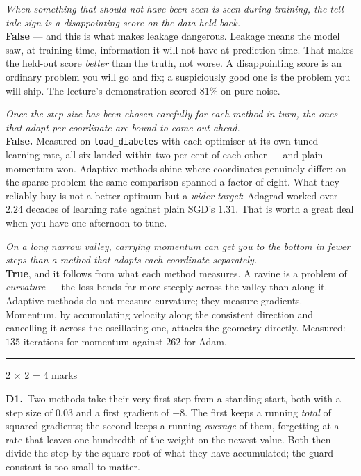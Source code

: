 \documentclass[10pt,a4paper]{article}
\newcommand{\parthead}[2]{\vspace{2pt}\noindent\rule{\linewidth}{0.4pt}\par\vspace{2pt}%
  \noindent{\bfseries Part #1}\hfill{\small #2}\par\vspace{1pt}}
\begin{document}
\begin{sC}

  \item \emph{When something that should not have been seen is seen during training, the tell-tale sign is a disappointing score on the data held back.}\\[2pt] \textbf{False} --- and this is what makes leakage dangerous. Leakage means the model saw, at training time, information it will not have at prediction time. That makes the held-out score \emph{better} than the truth, not worse. A disappointing score is an ordinary problem you will go and fix; a suspiciously good one is the problem you will ship. The lecture's demonstration scored $81\%$ on pure noise.

  \item \emph{Once the step size has been chosen carefully for each method in turn, the ones that adapt per coordinate are bound to come out ahead.}\\[2pt] \textbf{False.} Measured on \texttt{load\_diabetes} with each optimiser at its own tuned learning rate, all six landed within two per cent of each other --- and plain momentum won. Adaptive methods shine where coordinates genuinely differ: on the sparse problem the same comparison spanned a factor of eight. What they reliably buy is not a better optimum but a \emph{wider target}: Adagrad worked over $2.24$ decades of learning rate against plain SGD's $1.31$. That is worth a great deal when you have one afternoon to tune.

  \item \emph{On a long narrow valley, carrying momentum can get you to the bottom in fewer steps than a method that adapts each coordinate separately.}\\[2pt] \textbf{True}, and it follows from what each method measures. A ravine is a problem of \emph{curvature} --- the loss bends far more steeply across the valley than along it. Adaptive methods do not measure curvature; they measure gradients. Momentum, by accumulating velocity along the consistent direction and cancelling it across the oscillating one, attacks the geometry directly. Measured: $135$ iterations for momentum against $262$ for Adam.

\end{sC}

\newpage

\parthead{D --- Short answer}{2 $\times$ 2 = 4 marks}

\textbf{D1.}\ Two methods take their very first step from a standing start, both with a step size of $0.03$ and a first gradient of $+8$. The first keeps a running \emph{total} of squared gradients; the second keeps a running \emph{average} of them, forgetting at a rate that leaves one hundredth of the weight on the newest value. Both then divide the step by the square root of what they have accumulated; the guard constant is too small to matter.
\end{document}
